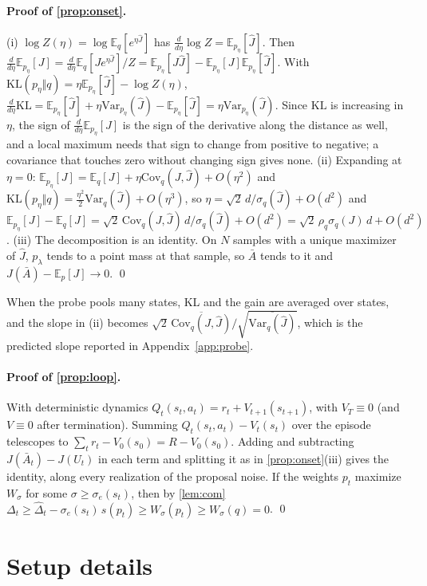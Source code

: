 \documentclass{article}
\theoremstyle{plain}
\theoremstyle{remark}
\newcommand{\E}{\mathbb{E}}
\newcommand{\KL}{\mathrm{KL}}
\newcommand{\Jh}{\hat{J}}
\newcommand{\Cov}{\mathrm{Cov}}
\newcommand{\Var}{\mathrm{Var}}
\begin{document}
\paragraph{Proof of \cref{prop:onset}.} (i) $\log Z(\eta)=\log\E_q[e^{\eta\Jh}]$ has $\tfrac{d}{d\eta}\log Z=\E_{p_\eta}[\Jh]$.
Then $\tfrac{d}{d\eta}\E_{p_\eta}[J]=\tfrac{d}{d\eta}\E_q[Je^{\eta\Jh}]/Z=\E_{p_\eta}[J\Jh]-\E_{p_\eta}[J]
\E_{p_\eta}[\Jh]$. With $\KL(p_\eta\Vert q)=\eta\E_{p_\eta}[\Jh]-\log Z(\eta)$,
$\tfrac{d}{d\eta}\KL=\E_{p_\eta}[\Jh]+\eta\Var_{p_\eta}(\Jh)-\E_{p_\eta}[\Jh]=\eta\Var_{p_\eta}(\Jh)$. Since $\KL$ is
increasing in $\eta$, the sign of $\tfrac{d}{d\eta}\E_{p_\eta}[J]$ is the sign of the derivative along the distance as
well, and a local maximum needs that sign to change from positive to negative; a covariance that touches zero without
changing sign gives none. (ii) Expanding at $\eta=0$: $\E_{p_\eta}[J]=\E_q[J]+\eta\Cov_q(J,\Jh)+O(\eta^2)$ and
$\KL(p_\eta\Vert q)=\tfrac{\eta^2}{2}\Var_q(\Jh)+O(\eta^3)$, so $\eta=\sqrt2\,d/\sigma_q(\Jh)+O(d^2)$ and
$\E_{p_\eta}[J]-\E_q[J]=\sqrt2\,\Cov_q(J,\Jh)\,d/\sigma_q(\Jh)+O(d^2)=\sqrt2\,\rho_q\sigma_q(J)\,d+O(d^2)$. (iii) The
decomposition is an identity. On $N$ samples with a unique maximizer of $\Jh$, $p_\lambda$ tends to a point mass at
that sample, so $\bar A$ tends to it and $J(\bar A)-\E_p[J]\to0$. \qed

When the probe pools many states, KL and the gain are averaged over states, and the slope in (ii) becomes
$\sqrt2\,\overline{\Cov_q(J,\Jh)}/\sqrt{\overline{\Var_q(\Jh)}}$, which is the predicted slope reported in
Appendix~\ref{app:probe}.

\paragraph{Proof of \cref{prop:loop}.} With deterministic dynamics $Q_t(s_t,a_t)=r_t+V_{t+1}(s_{t+1})$, with $V_T\equiv0$
(and $V\equiv0$ after termination). Summing $Q_t(s_t,a_t)-V_t(s_t)$ over the episode telescopes to
$\sum_tr_t-V_0(s_0)=R-V_0(s_0)$. Adding and subtracting $J(\bar A_t)-J(U_t)$ in each term and splitting it as in
\cref{prop:onset}(iii) gives the identity, along every realization of the proposal noise. If the weights $p_t$ maximize
$W_\sigma$ for some $\sigma\ge\sigma_e(s_t)$, then by \cref{lem:com}
$\Delta_t\ge\hat\Delta_t-\sigma_e(s_t)\,s(p_t)\ge W_\sigma(p_t)\ge W_\sigma(q)=0$. \qed

\section{Setup details}
\label{app:setup}
\end{document}
